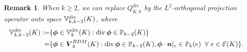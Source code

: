 \documentclass[10pt]{amsart}
\newtheorem{lemma}[theorem]{Lemma}
\newtheorem{remark}[theorem]{Remark}
\renewcommand{\div}{\operatorname{div}}
\numberwithin{equation}{section}
\begin{document}
\begin{remark}\rm
When $k\geq2$, we can replace $Q_{K,k}^{\div}$ by the $L^2$-orthogonal projection operator onto space $\mathbb{V}_{k,k-2}^{\rm div}(K)$, where
\begin{align*}
\mathbb{V}_{k,k-2}^{\rm div}(K):=&\{\boldsymbol{\phi}\in\mathbb{V}_{k}^{\rm div}(K): \div\boldsymbol{\phi}\in\mathbb P_{k-2}(K)\} \\
=&\{\boldsymbol{\phi}\in\boldsymbol{V}_{k}^{BDM}(K): \div\boldsymbol{\phi}\in\mathbb P_{k-2}(K), \boldsymbol{\phi}\cdot\boldsymbol{n}|_e\in\mathbb P_{k}(e)\;\;\forall~e\in\mathcal E(K)\}.
\end{align*}
\end{remark}
\end{document}
